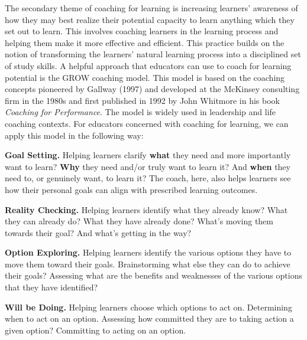 \documentclass[
]{book}
\begin{document}
The secondary theme of coaching for learning is increasing learners' awareness of how they may best realize their potential capacity to learn anything which they set out to learn. This involves coaching learners in the learning process and helping them make it more effective and efficient. This practice builds on the notion of transforming the learners' natural learning process into a disciplined set of study skills. A helpful approach that educators can use to coach for learning potential is the GROW coaching model. This model is based on the coaching concepts pioneered by Gallway (1997) and developed at the McKinsey consulting firm in the 1980s and first published in 1992 by John Whitmore in his book \emph{Coaching for Performance}. The model is widely used in leadership and life coaching contexts. For educators concerned with coaching for learning, we can apply this model in the following way:

\begin{bonus}
\textbf{Goal Setting.} Helping learners clarify \textbf{what} they need and more importantly want to learn? \textbf{Why} they need and/or truly want to learn it? And \textbf{when} they need to, or genuinely want, to learn it? The coach, here, also helps learners see how their personal goals can align with prescribed learning outcomes.

\textbf{Reality Checking.} Helping learners identify what they already know? What they can already do? What they have already done? What's moving them towards their goal? And what's getting in the way?

\textbf{Option Exploring.} Helping learners identify the various options they have to move them toward their goals. Brainstorming what else they can do to achieve their goals? Assessing what are the benefits and weaknesses of the various options that they have identified?

\textbf{Will be Doing.} Helping learners choose which options to act on. Determining when to act on an option. Assessing how committed they are to taking action a given option? Committing to acting on an option.
\end{bonus}
\end{document}
